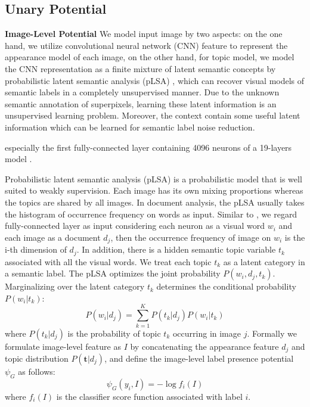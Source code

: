 \subsection{Unary Potential}
\textbf{Image-Level Potential}
We model input image by two aspects: on the one hand, we utilize convolutional neural network (CNN) feature to represent the appearance model of each image, on the other hand, for topic model, we model the CNN representation as a finite mixture of latent semantic concepts by probabilistic latent semantic analysis (pLSA) \cite{sivic2005discovering}, which can recover visual models of semantic labels in a completely unsupervised manner. Due to the unknown semantic annotation of superpixels, learning these latent information is an unsupervised learning problem. Moreover, the context contain some useful latent information which can be learned for semantic label noise reduction.

\if
especially the first fully-connected layer containing 4096 neurons of a 19-layers model \cite{simonyan2014very}.

Probabilistic latent semantic analysis (pLSA) is a probabilistic model that is well suited to weakly supervision. Each image has its own mixing proportions whereas the topics are shared by all images. In document analysis, the pLSA usually takes the histogram of occurrence frequency on words as input.
\fi
Similar to \cite{wang2014weakly}, we regard fully-connected layer as input considering each neuron as a visual word $w_i$ and each image as a document $d_j$, then the occurrence frequency of image on $w_i$ is the i-th dimension of $d_j$. In addition, there is a hidden semantic topic variable $t_k$ associated with all the visual words. We treat each topic $t_k$ as a latent category in a semantic label. The pLSA optimizes the joint probability $P(w_i,d_j,t_k)$. Marginalizing over the latent category $t_k$ determines the conditional probability $P(w_i|t_k)$:
\begin{equation}
  P(w_i|d_j) = \sum_{k=1}^K{P(t_k|d_j)P(w_i|t_k)}
\end{equation}
where $P(t_k|d_j)$ is the probability of topic $t_k$ occurring in image $j$. Formally we formulate image-level feature as $I$ by concatenating the appearance feature $d_j$ and topic distribution $P(\boldsymbol{t}|d_j)$, and define the image-level label presence potential $\psi_{G}$ as follows:
\begin{equation}
    \psi_{G}(y_i,I) = -\log f_{i}(I)
    \label{eq:global}
\end{equation}
where $f_{i}(I)$ is the classifier score function associated with label $i$.

